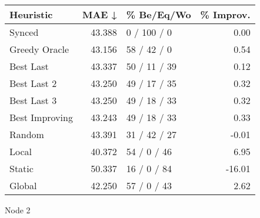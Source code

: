 \begin{tabular}{lrlr}
\toprule
\textbf{Heuristic} & \textbf{MAE ↓} & \textbf{\% Be/Eq/Wo} & \textbf{\% Improv.} \\
\midrule
            Synced &         43.388 &          0 / 100 / 0 &                0.00 \\
     Greedy Oracle &         43.156 &          58 / 42 / 0 &                0.54 \\
         Best Last &         43.337 &         50 / 11 / 39 &                0.12 \\
       Best Last 2 &         43.250 &         49 / 17 / 35 &                0.32 \\
       Best Last 3 &         43.250 &         49 / 18 / 33 &                0.32 \\
    Best Improving &         43.243 &         49 / 18 / 33 &                0.33 \\
            Random &         43.391 &         31 / 42 / 27 &               -0.01 \\
             Local &         40.372 &          54 / 0 / 46 &                6.95 \\
            Static &         50.337 &          16 / 0 / 84 &              -16.01 \\
            Global &         42.250 &          57 / 0 / 43 &                2.62 \\
\bottomrule
\end{tabular}
\caption{Node 2}
\label{tab:iid_lr01_le1_bs2_2}
